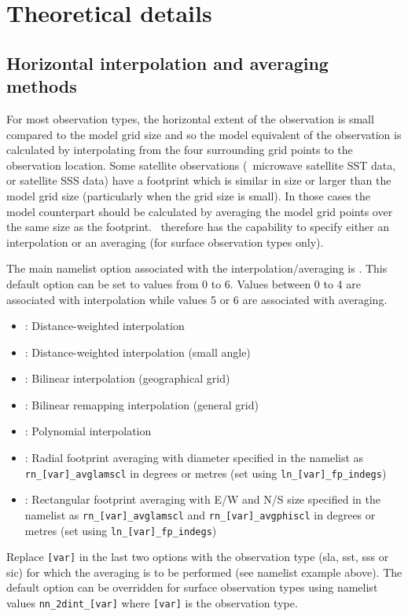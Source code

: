 \documentclass[../main/NEMO_manual]{subfiles}
\begin{document}
\section{Theoretical details}
\label{sec:OBS_theory}

\subsection{Horizontal interpolation and averaging methods}

For most observation types, the horizontal extent of the observation is small compared to the model grid size and so
the model equivalent of the observation is calculated by interpolating from
the four surrounding grid points to the observation location.
Some satellite observations (\eg\ microwave satellite SST data, or satellite SSS data) have a footprint which
is similar in size or larger than the model grid size (particularly when the grid size is small).
In those cases the model counterpart should be calculated by averaging the model grid points over
the same size as the footprint.
\NEMO\ therefore has the capability to specify either an interpolation or an averaging
(for surface observation types only).

The main namelist option associated with the interpolation/averaging is .
This default option can be set to values from 0 to 6.
Values between 0 to 4 are associated with interpolation while values 5 or 6 are associated with averaging.
\begin{itemize}
\item {}: Distance-weighted interpolation
\item {}: Distance-weighted interpolation (small angle)
\item {}: Bilinear interpolation (geographical grid)
\item {}: Bilinear remapping interpolation (general grid)
\item {}: Polynomial interpolation
\item {}: Radial footprint averaging with diameter specified in the namelist as
  \texttt{rn\_[var]\_avglamscl} in degrees or metres (set using \texttt{ln\_[var]\_fp\_indegs})
\item {}: Rectangular footprint averaging with E/W and N/S size specified in
  the namelist as \texttt{rn\_[var]\_avglamscl} and \texttt{rn\_[var]\_avgphiscl} in degrees or metres
  (set using \texttt{ln\_[var]\_fp\_indegs})
\end{itemize}
Replace \texttt{[var]} in the last two options with the observation type (sla, sst, sss or sic) for
which the averaging is to be performed (see namelist example above).
The  default option can be overridden for surface observation types using
namelist values \texttt{nn\_2dint\_[var]} where \texttt{[var]} is the observation type.
\end{document}
